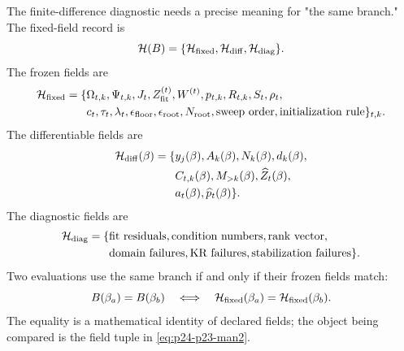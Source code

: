\documentclass[11pt]{article}
\numberwithin{equation}{section}
\begin{document}
The finite-difference diagnostic needs a precise meaning for "the same
branch."  The fixed-field record is
\begin{equation}
    \mathcal H(B)
    =
    \{\mathcal H_{\rm fixed},\mathcal H_{\rm diff},\mathcal H_{\rm diag}\}.
    \label{eq:p24-p23-man1}
\end{equation}
The frozen fields are
\begin{equation}
\begin{aligned}
    \mathcal H_{\rm fixed}
    =
    \{&
    \Omega_{t,k},\Psi_{t,k},J_t,
    Z_{\rm fit}^{(t)},W^{(t)},p_{t,k},R_{t,k},
    S_t,\rho_t,\\
    &c_t,\tau_t,\lambda_t,\epsilon_{\rm floor},
    \epsilon_{\rm root},N_{\rm root},
    \text{sweep order},\text{initialization rule}\}_{t,k}.
\end{aligned}
    \label{eq:p24-p23-man2}
\end{equation}
The differentiable fields are
\begin{equation}
    \begin{aligned}
    \mathcal H_{\rm diff}(\beta)
    =
    \{&
    y_j(\beta),A_k(\beta),N_k(\beta),d_k(\beta),\\
    &C_{t,k}(\beta),M_{>k}(\beta),\widehat Z_t(\beta),\\
    &a_t(\beta),\widehat p_t(\beta)\}.
    \end{aligned}
    \label{eq:p24-p23-man3}
\end{equation}
The diagnostic fields are
\begin{equation}
    \begin{aligned}
    \mathcal H_{\rm diag}
    =
    \{&
    \text{fit residuals},\text{condition numbers},\text{rank vector},\\
    &\text{domain failures},\text{KR failures},
      \text{stabilization failures}\}.
    \end{aligned}
    \label{eq:p24-p23-man4}
\end{equation}
Two evaluations use the same branch if and only if their frozen fields match:
\begin{equation}
    B(\beta_a)=B(\beta_b)
    \quad\Longleftrightarrow\quad
    \mathcal H_{\rm fixed}(\beta_a)=\mathcal H_{\rm fixed}(\beta_b).
    \label{eq:p24-p23-man5}
\end{equation}
The equality is a mathematical identity of declared fields; the object being
compared is the field tuple in \eqref{eq:p24-p23-man2}.
\end{document}
